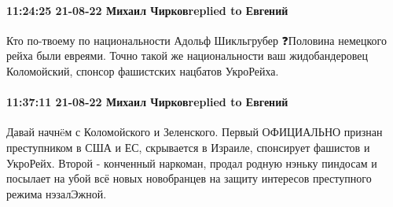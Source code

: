\paragraph{11:24:25 21-08-22 Михаил Чирковreplied to Евгений}

Кто по-твоему по национальности Адольф Шикльгрубер ❓Половина немецкого рейха были евреями.
Точно такой же национальности ваш жидобандеровец Коломойский, спонсор фашистских нацбатов УкроРейха.

\paragraph{11:37:11 21-08-22 Михаил Чирковreplied to Евгений}

Давай начнëм с Коломойского и Зеленского.
Первый ОФИЦИАЛЬНО признан преступником в США и ЕС, скрывается в Израиле, спонсирует фашистов и УкроРейх.
Второй - конченный наркоман, продал родную нэньку пиндосам и посылает на убой всё новых новобранцев на защиту интересов преступного режима нэзалЭжной.
